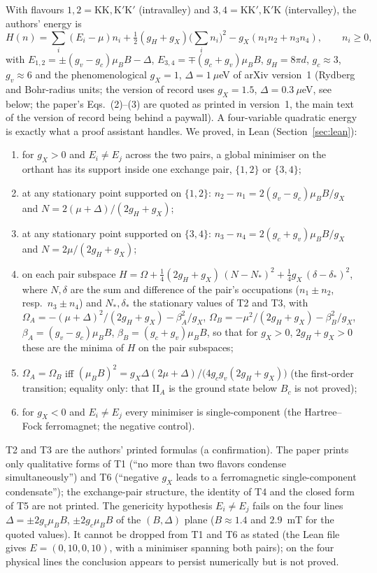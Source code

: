 \documentclass[11pt,a4paper]{article}
\begin{document}
With flavours $1,2=\mathrm{KK},\mathrm{K'K'}$ (intravalley) and $3,4=\mathrm{KK'},\mathrm{K'K}$ (intervalley), the authors' energy is
\begin{equation}
H(n)=\sum_i(E_i-\mu)n_i+\tfrac12(g_H+g_X)\Big(\sum_in_i\Big)^2-g_X(n_1n_2+n_3n_4),\qquad n_i\ge0,
\end{equation}
with $E_{1,2}=\pm(g_v-g_c)\mu_BB-\Delta$, $E_{3,4}=\mp(g_c+g_v)\mu_BB$, $g_H=8\pi d$, $g_c\approx3$, $g_v\approx6$ and the
phenomenological $g_X=1$, $\Delta=1~\mu$eV of arXiv version~1 (Rydberg and Bohr-radius units; the version of record uses
$g_X=1.5$, $\Delta=0.3~\mu$eV, see below; the paper's Eqs.~(2)--(3) are quoted as printed in version~1, the main text of the version of record being behind a
paywall). A four-variable quadratic energy is exactly what a
proof assistant handles. We proved, in Lean (Section~\ref{sec:lean}):
\begin{enumerate}[nosep,label=\textbf{T\arabic*.}]
\item for $g_X>0$ and $E_i\neq E_j$ across the two pairs, a global minimiser on the orthant has its support inside one exchange
pair, $\{1,2\}$ or $\{3,4\}$;
\item at any stationary point supported on $\{1,2\}$: $n_2-n_1=2(g_v-g_c)\mu_BB/g_X$ and $N=2(\mu+\Delta)/(2g_H+g_X)$;
\item at any stationary point supported on $\{3,4\}$: $n_3-n_4=2(g_c+g_v)\mu_BB/g_X$ and $N=2\mu/(2g_H+g_X)$;
\item on each pair subspace $H=\Omega+\tfrac14(2g_H+g_X)\,(N-N_*)^2+\tfrac14g_X\,(\delta-\delta_*)^2$, where $N,\delta$ are the sum and
difference of the pair's occupations ($n_1\pm n_2$, resp.\ $n_3\pm n_4$) and $N_*,\delta_*$ the stationary values of T2 and T3, with
$\Omega_A=-(\mu+\Delta)^2/(2g_H+g_X)-\beta_A^2/g_X$, $\Omega_B=-\mu^2/(2g_H+g_X)-\beta_B^2/g_X$, $\beta_A=(g_v-g_c)\mu_BB$,
$\beta_B=(g_c+g_v)\mu_BB$, so that for $g_X>0$, $2g_H+g_X>0$ these are the minima of $H$ on the pair subspaces;
\item $\Omega_A=\Omega_B$ iff $(\mu_BB)^2=g_X\Delta(2\mu+\Delta)/\big(4g_cg_v(2g_H+g_X)\big)$ (the first-order transition; equality
only: that II$_A$ is the ground state below $B_c$ is not proved);
\item for $g_X<0$ and $E_i\neq E_j$ every minimiser is single-component (the Hartree--Fock ferromagnet; the negative control).
\end{enumerate}
T2 and T3 are the authors' printed formulas (a confirmation). The paper prints only qualitative forms of T1 (``no more than two
flavors condense simultaneously'') and T6 (``negative $g_X$ leads to a ferromagnetic single-component condensate''); the exchange-pair
structure, the identity of T4 and the closed form of T5 are not printed. The genericity hypothesis $E_i\neq E_j$ fails on the four lines
$\Delta=\pm2g_v\mu_BB$, $\pm2g_c\mu_BB$ of the $(B,\Delta)$ plane ($B\approx1.4$ and $2.9$~mT for the quoted values). It cannot be
dropped from T1 and T6 as stated (the Lean file gives $E=(0,10,0,10)$, with a minimiser spanning both pairs); on the four physical lines
the conclusion appears to persist numerically but is not proved.
\end{document}
